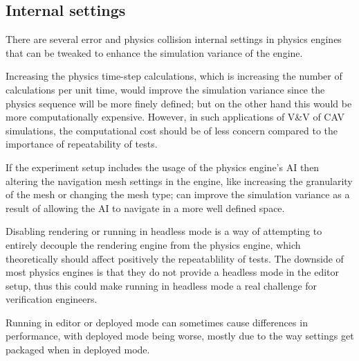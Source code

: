 \subsection{Internal settings}
There are several error and physics collision internal settings in physics engines that can be tweaked to enhance the simulation variance of the engine.

Increasing the physics time-step calculations, which is increasing the number of calculations per unit time, would improve the simulation variance since the physics sequence will be more finely defined; but on the other hand this would be more computationally expensive. However, in such applications of V\&V of CAV simulations, the computational cost should be of less concern compared to the importance of repeatability of tests.

If the experiment setup includes the usage of the physics engine's AI then altering the navigation mesh settings in the engine, like increasing the granularity of the mesh or changing the mesh type; can improve the simulation variance as a result of allowing the AI to navigate in a more well defined space. 

Disabling rendering or running in headless mode is a way of attempting to entirely decouple the rendering engine from the physics engine, which theoretically should affect positively the repeatablility of tests. 
The downside of most physics engines is that they do not provide a headless mode in the editor setup, thus this could make running in headless mode a real challenge for verification engineers.

Running in editor or deployed mode can sometimes cause differences in performance, with deployed mode being worse, mostly due to the way settings get packaged when in deployed mode.

